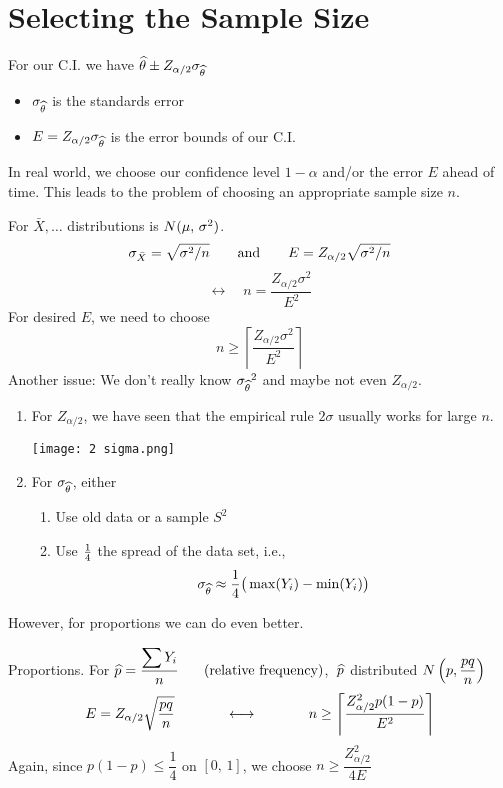 \section{Selecting the Sample Size}

For our C.I. we have $\widehat{\theta}\pm Z_{\alpha/2}\sigma_{\widehat{\theta}}$
    \begin{itemize}
        \item $\sigma_{\widehat{\theta}}$ is the standards error
        \item $E = Z_{\alpha/2}\sigma_{\widehat{\theta}}$ is the error bounds of our C.I.
    \end{itemize}
    In real world, we choose our confidence level $1-\alpha$ and/or the error $E$ ahead of time. This leads to the problem of choosing an appropriate sample size $n$.
    
    \example For $\bar{X}, \dots$ distributions is $\normalDist*$.
    $$\sigma_{\bar{X}} = \sqrt{\sigma^2/n} \qquad \text{and} \qquad E = Z_{\alpha/2} \sqrt{\sigma^2/n}$$
    $$\longleftrightarrow\quad n = \frac{Z_{\alpha/2}\sigma^2}{E^2}$$
    For desired $E$, we need to choose
    $$n \geq \left\lceil \frac{Z_{\alpha/2}\sigma^2}{E^2}\right\rceil$$
    Another issue: We don't really know ${\sigma_{\widehat{\theta}}}^2$ and maybe not even $Z_{\alpha/2}$.

    \begin{enumerate}[label=\textcircled{\raisebox{-1pt}{\arabic*}}]
        \item For $Z_{\alpha/2}$, we have seen that the empirical rule $2\sigma$ usually works for large $n$.
        \begin{center}\texttt{[image: 2 sigma.png]}\end{center}

        \item For $\sigma_{\widehat{\theta}}$, either
        \begin{enumerate}[label=\textbf{{\alph*}.)}]
            \item Use old data or a  sample $S^2$
            \item Use $\over{4}$ the spread of the data set, i.e.,
            $$\sigma_{\that} \approx \over{4} \big( \operatorname{max}(Y_i)-\operatorname{min}(Y_i)\big) $$
        \end{enumerate}
    \end{enumerate}
    However, for proportions we can do even better.

    \example Proportions. For 
    $\widehat{p} = \dfrac{\displaystyle \sum Y_i}{n} \hspace{0.25in} \text{(relative frequency)}$,  
    $\;\widehat{p}$ distributed $N\pars{p, \dfrac{pq}{n}}$
    $$E = Z_{\alpha/2} \sqrt{\frac{pq}{n}} \hspace{.5in} \longleftrightarrow \hspace{0.5in} n \geq \left\lceil \frac{Z_{\alpha/2}^2p(1-p)}{E^2}\right\rceil $$
    Again, since $p(1-p) \leq \dfrac{1}{4}$ on $[0,\,1]$, we choose $n \geq \dfrac{Z_{\alpha/2}^2}{4E}$

